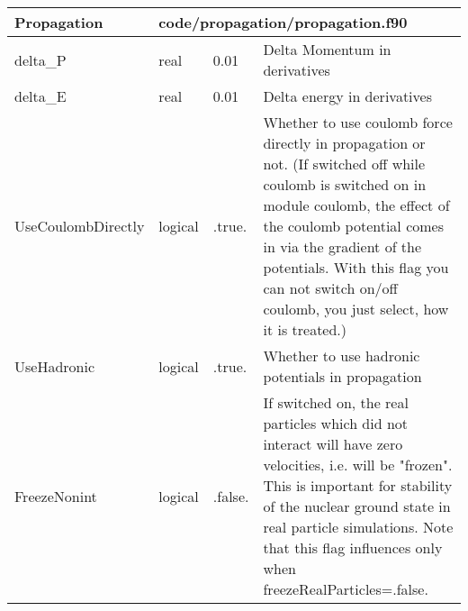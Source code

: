 \documentclass{article}
\begin{document}
\begin{longtable}{llll}
\toprule
\textbf{\large{Propagation}} & \multicolumn{3}{l}{\footnotesize{code/propagation/propagation.f90}}\\*
\midrule
\endfirsthead
\midrule
\endhead
delta\_P & \begin{minipage}[t]{2cm}real\end{minipage} & \begin{minipage}[t]{2cm}0.01\end{minipage} & \begin{minipage}[t]{12cm}Delta Momentum in derivatives\end{minipage}\\*
\midrule
delta\_E & \begin{minipage}[t]{2cm}real\end{minipage} & \begin{minipage}[t]{2cm}0.01\end{minipage} & \begin{minipage}[t]{12cm}Delta energy in derivatives\end{minipage}\\*
\midrule
UseCoulombDirectly & \begin{minipage}[t]{2cm}logical\end{minipage} & \begin{minipage}[t]{2cm}.true.\end{minipage} & \begin{minipage}[t]{12cm}Whether to use coulomb force directly in propagation or not. (If switched off while coulomb is switched on in module coulomb, the effect of the coulomb potential comes in via the gradient of the potentials. With this flag you can not switch on/off coulomb, you just select, how it is treated.)\end{minipage}\\*
\midrule
UseHadronic & \begin{minipage}[t]{2cm}logical\end{minipage} & \begin{minipage}[t]{2cm}.true.\end{minipage} & \begin{minipage}[t]{12cm}Whether to use hadronic potentials in propagation\end{minipage}\\*
\midrule
FreezeNonint & \begin{minipage}[t]{2cm}logical\end{minipage} & \begin{minipage}[t]{2cm}.false.\end{minipage} & \begin{minipage}[t]{12cm}If switched on, the real particles which did not interact will have zero velocities, i.e. will be "frozen". This is important for stability of the nuclear ground state in real particle simulations. Note that this flag influences only when freezeRealParticles=.false.\end{minipage}\\*

\end{longtable}
\end{document}
